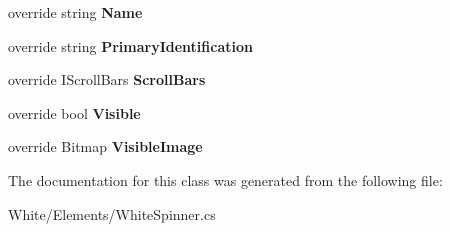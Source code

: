 \begin{DoxyCompactItemize}
\item 
\hypertarget{class_proto_test_1_1_golem_1_1_white_1_1_elements_1_1_white_spinner_a7dd1b65518d225f2fd7887a32183abea}{override string {\bfseries Name}}\label{class_proto_test_1_1_golem_1_1_white_1_1_elements_1_1_white_spinner_a7dd1b65518d225f2fd7887a32183abea}

\item 
\hypertarget{class_proto_test_1_1_golem_1_1_white_1_1_elements_1_1_white_spinner_a31b27bdc3ed1f807fb92f593511a1d03}{override string {\bfseries Primary\-Identification}}\label{class_proto_test_1_1_golem_1_1_white_1_1_elements_1_1_white_spinner_a31b27bdc3ed1f807fb92f593511a1d03}

\item 
\hypertarget{class_proto_test_1_1_golem_1_1_white_1_1_elements_1_1_white_spinner_ac2da02ce0982e0a5922bf183755bdb0b}{override I\-Scroll\-Bars {\bfseries Scroll\-Bars}}\label{class_proto_test_1_1_golem_1_1_white_1_1_elements_1_1_white_spinner_ac2da02ce0982e0a5922bf183755bdb0b}

\item 
\hypertarget{class_proto_test_1_1_golem_1_1_white_1_1_elements_1_1_white_spinner_ae238fb0dcb299e43c563c1672138ff69}{override bool {\bfseries Visible}}\label{class_proto_test_1_1_golem_1_1_white_1_1_elements_1_1_white_spinner_ae238fb0dcb299e43c563c1672138ff69}

\item 
\hypertarget{class_proto_test_1_1_golem_1_1_white_1_1_elements_1_1_white_spinner_ad54a812dad21e3777ba8c4125c4f52d4}{override Bitmap {\bfseries Visible\-Image}}\label{class_proto_test_1_1_golem_1_1_white_1_1_elements_1_1_white_spinner_ad54a812dad21e3777ba8c4125c4f52d4}

\end{DoxyCompactItemize}


The documentation for this class was generated from the following file\-:\begin{DoxyCompactItemize}
\item 
White/\-Elements/White\-Spinner.\-cs\end{DoxyCompactItemize}
